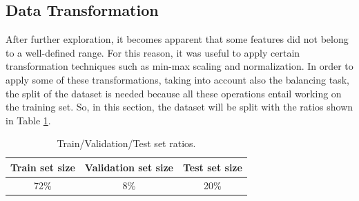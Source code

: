 \documentclass[../main]{subfiles}
\begin{document}
\subsection*{Data Transformation}
After further exploration, it becomes apparent that some features did not belong to a well-defined range.
For this reason, it was useful to apply certain transformation techniques such as min-max scaling and normalization.
In order to apply some of these transformations, taking into account also the balancing task, the split of the dataset is needed because all these operations entail working on the training set.
So, in this section, the dataset will be split with the ratios shown in Table \ref{table:dataset_split}.
\begin{table}[h]
    \center
    \begin{tabular}{|c|c|c|}
        \hline
        \textbf{Train set size} & \textbf{Validation set size} & \textbf{Test set size} \\
        \hline
        72\%                    & 8\%                          & 20\%                   \\
        \hline
    \end{tabular}
    \caption{Train/Validation/Test set ratios.}
    \label{table:dataset_split}
\end{table}
\end{document}
